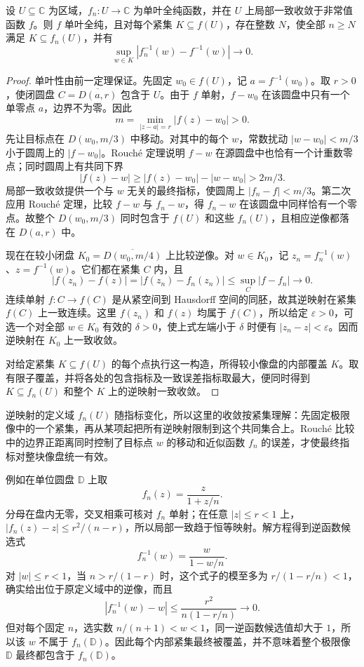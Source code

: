 \begin{proposition}[单叶逆映射的收敛]\label{b3:prop:04-inverse-convergence}
设 \(U\subseteq\mathbb C\) 为区域，\(f_n:U\rightarrow\mathbb C\) 为单叶全纯函数，并在 \(U\) 上局部一致收敛于非常值函数 \(f\)。则 \(f\) 单叶全纯，且对每个紧集 \(K\subseteq f(U)\)，存在整数 \(N\)，使全部 \(n\ge N\) 满足 \(K\subseteq f_n(U)\)，并有
\[
 \sup_{w\in K}|f_n^{-1}(w)-f^{-1}(w)|\longrightarrow0.
\]
\end{proposition}
\begin{proof}
单叶性由前一定理保证。先固定 \(w_0\in f(U)\)，记 \(a=f^{-1}(w_0)\)。取 \(r>0\)，使闭圆盘 \(C=\overline{D(a,r)}\) 包含于 \(U\)。由于 \(f\) 单射，\(f-w_0\) 在该圆盘中只有一个单零点 \(a\)，边界不为零。因此
\[
 m=\min_{|z-a|=r}|f(z)-w_0|>0.
\]
先让目标点在 \(D(w_0,m/3)\) 中移动。对其中的每个 \(w\)，常数扰动 \(|w-w_0|<m/3\) 小于圆周上的 \(|f-w_0|\)。Rouché 定理说明 \(f-w\) 在源圆盘中也恰有一个计重数零点；同时圆周上有共同下界
\[
 |f(z)-w|\ge |f(z)-w_0|-|w-w_0|>2m/3.
\]
局部一致收敛提供一个与 \(w\) 无关的最终指标，使圆周上 \(|f_n-f|<m/3\)。第二次应用 Rouché 定理，比较 \(f-w\) 与 \(f_n-w\)，得 \(f_n-w\) 在该圆盘中同样恰有一个零点。故整个 \(D(w_0,m/3)\) 同时包含于 \(f(U)\) 和这些 \(f_n(U)\)，且相应逆像都落在 \(D(a,r)\) 中。

现在在较小闭盘 \(K_0=\overline{D(w_0,m/4)}\) 上比较逆像。对 \(w\in K_0\)，记 \(z_n=f_n^{-1}(w)\)、\(z=f^{-1}(w)\)。它们都在紧集 \(C\) 内，且
\[
 |f(z_n)-f(z)|=|f(z_n)-f_n(z_n)|
 \le\sup_C|f-f_n|\longrightarrow0.
\]
连续单射 \(f:C\rightarrow f(C)\) 是从紧空间到 Hausdorff 空间的同胚，故其逆映射在紧集 \(f(C)\) 上一致连续。这里 \(f(z_n)\) 和 \(f(z)\) 均属于 \(f(C)\)，所以给定 \(\varepsilon>0\)，可选一个对全部 \(w\in K_0\) 有效的 \(\delta>0\)，使上式左端小于 \(\delta\) 时便有 \(|z_n-z|<\varepsilon\)。因而逆映射在 \(K_0\) 上一致收敛。

对给定紧集 \(K\subseteq f(U)\) 的每个点执行这一构造，所得较小像盘的内部覆盖 \(K\)。取有限子覆盖，并将各处的包含指标及一致误差指标取最大，便同时得到 \(K\subseteq f_n(U)\) 和整个 \(K\) 上的逆映射一致收敛。
\end{proof}

逆映射的定义域 \(f_n(U)\) 随指标变化，所以这里的收敛按紧集理解：先固定极限像中的一个紧集，再从某项起把所有逆映射限制到这个共同集合上。Rouché 比较中的边界正距离同时控制了目标点 \(w\) 的移动和近似函数 \(f_n\) 的误差，才使最终指标对整块像盘统一有效。

\ProseParagraphBreak

例如在单位圆盘 \(\mathbb D\) 上取
\[
 f_n(z)=\frac{z}{1+z/n}.
\]
分母在盘内无零，交叉相乘可核对 \(f_n\) 单射；在任意 \(|z|\le r<1\) 上，\(|f_n(z)-z|\le r^2/(n-r)\)，所以局部一致趋于恒等映射。解方程得到逆函数候选式
\[
 f_n^{-1}(w)=\frac{w}{1-w/n}.
\]
对 \(|w|\le r<1\)，当 \(n>r/(1-r)\) 时，这个式子的模至多为 \(r/(1-r/n)<1\)，确实给出位于原定义域中的逆像，而且
\[
 |f_n^{-1}(w)-w|\le\frac{r^2}{n(1-r/n)}\longrightarrow0.
\]
但对每个固定 \(n\)，选实数 \(n/(n+1)<w<1\)，同一逆函数候选值却大于 \(1\)，所以该 \(w\) 不属于 \(f_n(\mathbb D)\)。因此每个内部紧集最终被覆盖，并不意味着整个极限像 \(\mathbb D\) 最终都包含于 \(f_n(\mathbb D)\)。

